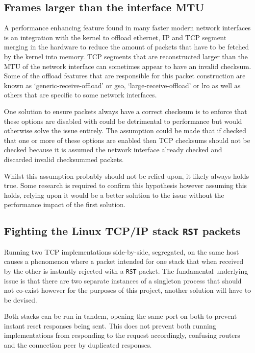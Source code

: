 \documentclass[11pt,a4paper,british]{bhamarticle}
\begin{document}
\begin{multicols}{2}
\subsection{Frames larger than the interface MTU}
A performance enhancing feature found in many faster modern network interfaces is an integration with the kernel to offload ethernet, IP and TCP segment merging in the hardware to reduce the amount of packets that have to be fetched by the kernel into memory. TCP segments that are reconstructed larger than the MTU of the network interface can sometimes appear to have an invalid checksum. Some of the offload features that are responsible for this packet construction are known as `generic-receive-offload' or gso, `large-receive-offload' or lro as well as others that are specific to some network interfaces.

One solution to ensure packets always have a correct checksum is to enforce that these options are disabled with could be detrimental to performance but would otherwise solve the issue entirely. The assumption could be made that if checked that one or more of these options are enabled then TCP checksums should not be checked because it is assumed the network interface already checked and discarded invalid checksummed packets.

Whilst this assumption probably should not be relied upon, it likely always holds true. Some research is required to confirm this hypothesis however assuming this holds, relying upon it would be a better solution to the issue without the performance impact of the first solution.

\subsection{Fighting the Linux TCP/IP stack \texttt{RST} packets}
Running two TCP implementations side-by-side, segregated, on the same host causes a phenomenon where a packet intended for one stack that when received by the other is instantly rejected with a \texttt{RST} packet. The fundamental underlying issue is that there are two separate instances of a singleton process that should not co-exist however for the purposes of this project, another solution will have to be devised.

Both stacks can be run in tandem, opening the same port on both to prevent instant reset responses being sent. This does not prevent both running implementations from responding to the request accordingly, confusing routers and the connection peer by duplicated responses.


\end{multicols}
\end{document}
